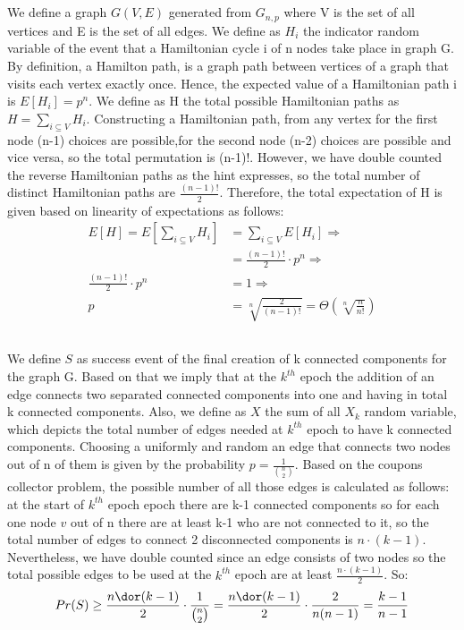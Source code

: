 \documentclass[11pt]{537homework}
\begin{document}
\subsection{} 
We define a graph $G(V,E)$ generated from $G_{n,p}$ where V is the set of all vertices and E is the set of all edges. We define as $H_i$ the indicator random variable of the event that a Hamiltonian cycle i of n nodes take place in graph G. By definition, a Hamilton path, is a graph path between vertices of a graph that visits each vertex exactly once. Hence, the expected value of a Hamiltonian path i is $E[H_i] = p^n$. We define as H the total possible Hamiltonian paths as $H = \sum_{i \subseteq V}^{} H_i$. Constructing a Hamiltonian path, from any vertex for the first node (n-1) choices are possible,for the second node (n-2) choices are possible and vice versa, so the total permutation is (n-1)!. However, we have double counted the reverse Hamiltonian paths as the hint expresses, so the total number of distinct Hamiltonian paths are $\frac{(n-1)!}{2}$. Therefore, the total expectation of H is given based on linearity of expectations as follows: 
\begin{align*}
    E[H] = E[\sum_{i \subseteq V}^{} H_i] &= \sum_{i \subseteq V}^{} E[H_i] \Longrightarrow \\
         &=\frac{(n-1)!}{2} \cdot p^n \Longrightarrow \\
         \frac{(n-1)!}{2} \cdot p^n  &= 1 \Longrightarrow \\
         p &= \sqrt[n]{\frac{2}{(n-1)!}} = \Theta(\sqrt[n]{\frac{n}{n!}})
\end{align*}
\subsection{} 
We define $S$ as success event of the final creation of k connected components for the graph G. Based on that we imply that at the $k^{th}$ epoch the addition of an edge connects two separated connected components into one and having in total k connected components. Also, we define as $X$ the sum of all $X_k$ random variable, which depicts the total number of edges needed at $k^{th}$ epoch to have k connected components. Choosing a uniformly and random an edge that connects two nodes out of n of them is given by the probability $p = \frac{1}{{n \choose 2}}$. Based on the coupons collector problem, the possible number of all those edges is calculated as follows: at the start of $k^{th}$ epoch epoch there are k-1 connected components so for each one node $v$ out of n there are at least k-1 who are not connected to it, so the total number of edges to connect 2 disconnected components is $n \cdot (k-1)$. Nevertheless, we have double counted since an edge consists of two nodes so the total possible edges to be used at the $k^{th}$ epoch are at least $\frac{n\cdot (k-1)}{2}$. So: 
\begin{align*}
    Pr(S) \geq \frac{n \dor (k-1)}{2} \cdot \frac{1}{{n \choose 2}} = \frac{n \dor (k-1)}{2} \cdot \frac{2}{n(n-1)} = \frac{k-1}{n-1}
\end{align*}
\end{document}
